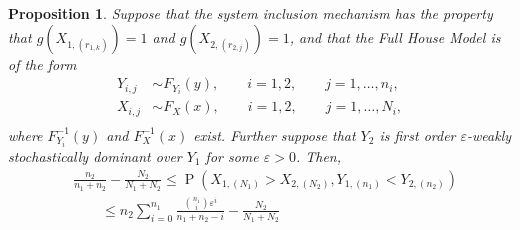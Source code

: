\documentclass[12pt]{article}
\DeclareMathOperator*{\Prob}{P}
\newtheorem{prop}[theorem]{Proposition}
\begin{document}
\begin{prop} \label{prop:weakstodom}
Suppose that the system inclusion mechanism has the property that $g(X_{1,(r_{1,k})}) = 1$ and $g(X_{2,(r_{2,j})}) = 1$, and that the Full House Model is of the form 
\begin{align*}
  Y_{i,j} &\sim F_{Y_i}(y), \qquad i = 1,2, \qquad j = 1,\ldots,n_i, \\
  X_{i,j} &\sim F_X(x), \qquad i = 1,2, \qquad j = 1,\ldots,N_i, \\
\end{align*}
where $F_{Y_i}^{-1}(y)$ and $F_X^{-1}(x)$ exist. Further suppose that $Y_2$ is first order $\varepsilon$-weakly stochastically dominant over $Y_1$ for some $\varepsilon > 0$. Then,
\begin{equation} \label{eq:paradox2}
\begin{split}
  &\frac{n_2}{n_1 + n_2} - \frac{N_2}{N_1 + N_2} \leq \Prob\left(X_{1,(N_1)} > X_{2,(N_2)}, Y_{1,(n_1)} < Y_{2,(n_2)}\right) \\
  &\qquad\leq n_2\sum_{i=0}^{n_1} \frac{{n_1 \choose i}\varepsilon^i}{n_1+n_2-i}- \frac{N_2}{N_1 + N_2}
\end{split}
\end{equation}
\end{prop}
\end{document}
